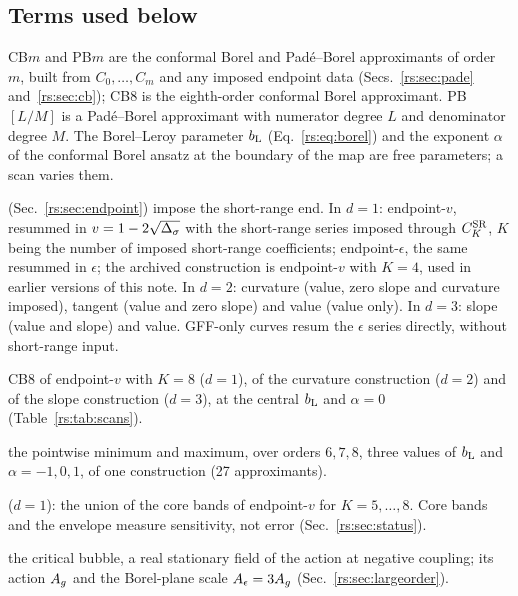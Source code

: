 \subsection{Terms used below}\label{rs:sec:terms}
\begin{description}[itemsep=1pt,leftmargin=1.2em]
\item[Approximants.] CB$m$ and PB$m$ are the conformal Borel and Pad\'e--Borel approximants
of order $m$, built from $C_0,\dots,C_m$ and any imposed endpoint data (Secs.~\ref{rs:sec:pade}
and~\ref{rs:sec:cb}); CB8 is the
eighth-order conformal Borel approximant. PB$[L/M]$ is a Pad\'e--Borel approximant with
numerator degree $L$ and denominator degree $M$. The Borel--Leroy parameter $b_{\mathrm L}$
(Eq.~\eqref{rs:eq:borel}) and the exponent $\alpha$ of the conformal Borel ansatz at the
boundary of the map are free parameters; a scan varies them.
\item[Endpoint constructions] (Sec.~\ref{rs:sec:endpoint}) impose the short-range end. In
$d=1$: endpoint-$v$, resummed in $v=1-2\sqrt{\Delta_\sigma}$ with the short-range series imposed
through $C^{\mathrm{SR}}_K$, $K$ being the number of imposed short-range coefficients; endpoint-$\epsilon$,
the same resummed in $\epsilon$; the archived construction is endpoint-$v$ with $K=4$, used
in earlier versions of this note. In $d=2$: curvature (value, zero slope and curvature
imposed), tangent (value and zero slope) and value (value only). In $d=3$: slope (value and
slope) and value. GFF-only curves resum the $\epsilon$ series directly, without short-range
input.
\item[Baseline:] CB8 of endpoint-$v$ with $K=8$ ($d=1$), of the curvature construction
($d=2$) and of the slope construction ($d=3$), at the central $b_{\mathrm L}$ and $\alpha=0$
(Table~\ref{rs:tab:scans}).
\item[Core band:] the pointwise minimum and maximum, over orders $6,7,8$, three values of
$b_{\mathrm L}$ and $\alpha=-1,0,1$, of one construction (27 approximants).
\item[Sensitivity envelope] ($d=1$): the union of the core bands of endpoint-$v$ for
$K=5,\dots,8$. Core bands and the envelope measure sensitivity, not error
(Sec.~\ref{rs:sec:status}).
\item[Instanton:] the critical bubble, a real stationary field of the action at negative
coupling; its action $A_g$ and the Borel-plane scale $A_\epsilon=3A_g$ (Sec.~\ref{rs:sec:largeorder}).
\end{description}

